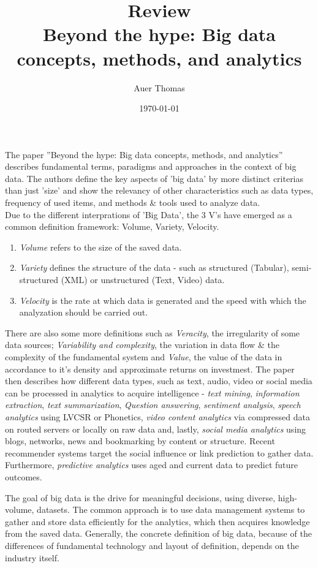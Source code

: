 \documentclass{article}
\title{\textbf{Review}\\Beyond the hype: Big data concepts, methods, and analytics}
\author{Auer Thomas}
\date{\today}
\begin{document}
\maketitle
\horrule{1pt}


\vspace{2em}

The paper ''Beyond the hype: Big data concepts, methods, and analytics'' describes fundamental terms, paradigms and approaches in the context of big data. 
The authors define the key aspects of 'big data' by more distinct criterias than just 'size' and show the relevancy of other characteristics such as data types, frequency of used items, and methods \& tools used to analyze data.\\
Due to the different interprations of 'Big Data', the 3 V's have emerged as a common definition framework: Volume, Variety, Velocity.
\begin{enumerate}[$\circ$]
    \item \emph{Volume} refers to the size of the saved data. 
    \item \emph{Variety} defines the structure of the data - such as structured (Tabular), semi-structured (XML) or unstructured (Text, Video) data.
    \item \emph{Velocity} is the rate at which data is generated and the speed with which the analyzation should be carried out.
\end{enumerate}
There are also some more definitions such as \emph{Veracity}, the irregularity of some data sources; \emph{Variability and complexity}, 
the variation in data flow \& the complexity of the fundamental system and \emph{Value}, the value of the data in accordance to it's density and approximate returns on investmest. 
The paper then describes how different data types, such as text, audio, video or social media can be processed in analytics to acquire intelligence - 
\emph{text mining}, \emph{information extraction}, \emph{text summarization}, \emph{Question answering}, \emph{sentiment analysis}, \emph{speech analytics}
using LVCSR or Phonetics, \emph{video content analytics} via compressed data on routed servers or locally on raw data and, lastly, \emph{social media analytics} using 
blogs, networks, news and bookmarking by content or structure. Recent recommender systems target the social influence or link prediction to gather data.
Furthermore, \emph{predictive analytics} uses aged and current data to predict future outcomes.

The goal of big data is the drive for meaningful decisions, using diverse, high-volume, datasets. 
The common approach is to use data management systems to gather and store data efficiently for the analytics, which then acquires knowledge from the saved data.
Generally, the concrete definition of big data, because of the differences of fundamental technology and layout of definition, depends on the industry itself.
\end{document}

